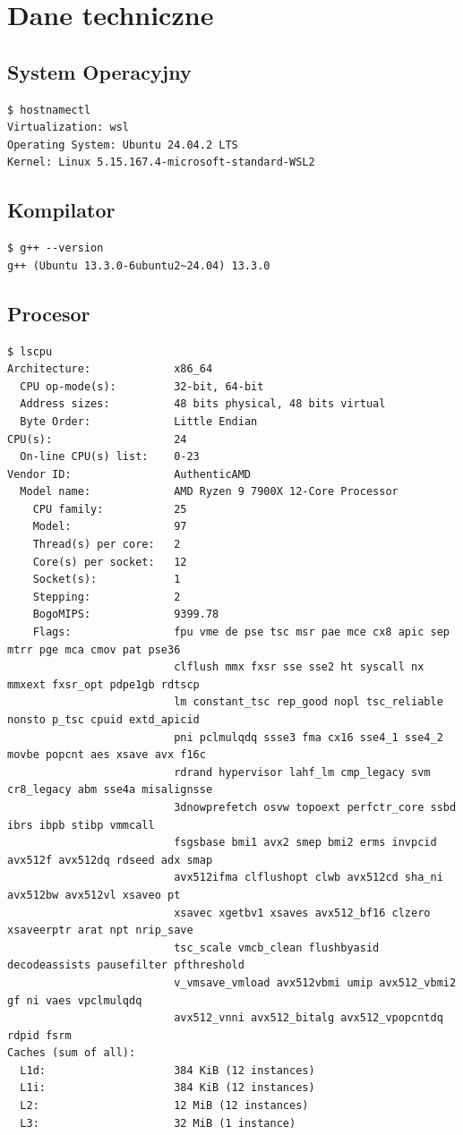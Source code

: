 \documentclass[12pt]{article}
\begin{document}
\newpage

\section*{Dane techniczne}
\subsection*{System Operacyjny}
\begin{verbatim}
$ hostnamectl
Virtualization: wsl
Operating System: Ubuntu 24.04.2 LTS
Kernel: Linux 5.15.167.4-microsoft-standard-WSL2
\end{verbatim}

\subsection*{Kompilator}
\begin{verbatim}
$ g++ --version
g++ (Ubuntu 13.3.0-6ubuntu2~24.04) 13.3.0
\end{verbatim}

\subsection*{Procesor}
\begin{verbatim}
$ lscpu
Architecture:             x86_64
  CPU op-mode(s):         32-bit, 64-bit
  Address sizes:          48 bits physical, 48 bits virtual
  Byte Order:             Little Endian
CPU(s):                   24
  On-line CPU(s) list:    0-23
Vendor ID:                AuthenticAMD
  Model name:             AMD Ryzen 9 7900X 12-Core Processor
    CPU family:           25
    Model:                97
    Thread(s) per core:   2
    Core(s) per socket:   12
    Socket(s):            1
    Stepping:             2
    BogoMIPS:             9399.78
    Flags:                fpu vme de pse tsc msr pae mce cx8 apic sep mtrr pge mca cmov pat pse36 
                          clflush mmx fxsr sse sse2 ht syscall nx mmxext fxsr_opt pdpe1gb rdtscp 
                          lm constant_tsc rep_good nopl tsc_reliable nonsto p_tsc cpuid extd_apicid 
                          pni pclmulqdq ssse3 fma cx16 sse4_1 sse4_2 movbe popcnt aes xsave avx f16c 
                          rdrand hypervisor lahf_lm cmp_legacy svm cr8_legacy abm sse4a misalignsse 
                          3dnowprefetch osvw topoext perfctr_core ssbd ibrs ibpb stibp vmmcall 
                          fsgsbase bmi1 avx2 smep bmi2 erms invpcid avx512f avx512dq rdseed adx smap 
                          avx512ifma clflushopt clwb avx512cd sha_ni avx512bw avx512vl xsaveo pt 
                          xsavec xgetbv1 xsaves avx512_bf16 clzero xsaveerptr arat npt nrip_save 
                          tsc_scale vmcb_clean flushbyasid decodeassists pausefilter pfthreshold 
                          v_vmsave_vmload avx512vbmi umip avx512_vbmi2 gf ni vaes vpclmulqdq 
                          avx512_vnni avx512_bitalg avx512_vpopcntdq rdpid fsrm
Caches (sum of all):      
  L1d:                    384 KiB (12 instances)
  L1i:                    384 KiB (12 instances)
  L2:                     12 MiB (12 instances)
  L3:                     32 MiB (1 instance)
\end{verbatim}
\end{document}
